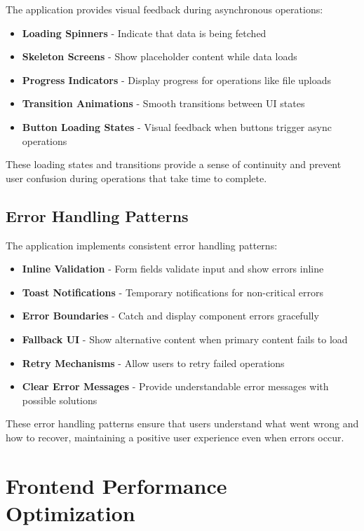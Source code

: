 The application provides visual feedback during asynchronous operations:

\begin{itemize}
  \item \textbf{Loading Spinners} - Indicate that data is being fetched
  \item \textbf{Skeleton Screens} - Show placeholder content while data loads
  \item \textbf{Progress Indicators} - Display progress for operations like file uploads
  \item \textbf{Transition Animations} - Smooth transitions between UI states
  \item \textbf{Button Loading States} - Visual feedback when buttons trigger async operations
\end{itemize}

These loading states and transitions provide a sense of continuity and prevent user confusion during operations that take time to complete.

\subsection{Error Handling Patterns}

The application implements consistent error handling patterns:

\begin{itemize}
  \item \textbf{Inline Validation} - Form fields validate input and show errors inline
  \item \textbf{Toast Notifications} - Temporary notifications for non-critical errors
  \item \textbf{Error Boundaries} - Catch and display component errors gracefully
  \item \textbf{Fallback UI} - Show alternative content when primary content fails to load
  \item \textbf{Retry Mechanisms} - Allow users to retry failed operations
  \item \textbf{Clear Error Messages} - Provide understandable error messages with possible solutions
\end{itemize}

These error handling patterns ensure that users understand what went wrong and how to recover, maintaining a positive user experience even when errors occur.

\section{Frontend Performance Optimization}

